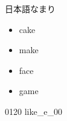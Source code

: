 \documentclass[aspectratio=169, xcolor={dvipsnames,table}]{beamer}
\begin{document}
\begin{frame}[plain]{日本語なまり}
  \LARGE

  \begin{itemize}[<+->]
    [circle]

    \item cake

    \item make

    \item face

    \item game
  \end{itemize}
  \hfill{\tiny 0120}\,{\scriptsize {}\,{\tiny like\_e\_00}}
\end{frame}
\end{document}

